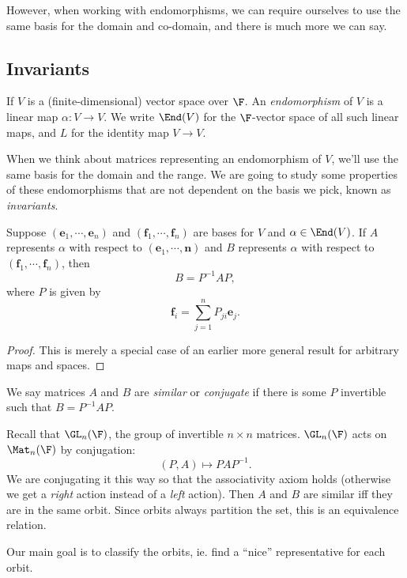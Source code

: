 \documentclass[a4paper]{article}
\begin{document}
However, when working with endomorphisms, we can require ourselves to use the same basis for the domain and co-domain, and there is much more we can say.

\subsection{Invariants}
\begin{defi}[]
  If $V$ is a (finite-dimensional) vector space over $\F$. An \emph{endomorphism} of $V$ is a linear map $\alpha: V \to V$. We write $\End(V)$ for the $\F$-vector space of all such linear maps, and $L$ for the identity map $V \to V$.
\end{defi}
When we think about matrices representing an endomorphism of $V$, we'll use the same basis for the domain and the range. We are going to study some properties of these endomorphisms that are not dependent on the basis we pick, known as \emph{invariants}.

\begin{lemma}
  Suppose $(\mathbf{e}_1, \cdots, \mathbf{e}_n)$ and $(\mathbf{f}_1, \cdots, \mathbf{f}_n)$ are bases for $V$ and $\alpha \in \End(V)$. If $A$ represents $\alpha$ with respect to $(\mathbf{e}_1, \cdots, \mathbf{n})$ and $B$ represents $\alpha$ with respect to $(\mathbf{f}_1,\cdots, \mathbf{f}_n)$, then
  \[
    B = P^{-1}AP,
  \]
  where $P$ is given by
  \[
    \mathbf{f}_i = \sum_{j = 1}^n P_{ji}\mathbf{e}_j.
  \]
\end{lemma}

\begin{proof}
  This is merely a special case of an earlier more general result for arbitrary maps and spaces.
\end{proof}

\begin{defi}
  We say matrices $A$ and $B$ are \emph{similar} or \emph{conjugate} if there is some $P$ invertible such that $B = P^{-1}AP$.
\end{defi}

Recall that $\GL_n(\F)$, the group of invertible $n\times n$ matrices. $\GL_n(\F)$ acts on $\Mat_n(\F)$ by conjugation:
\[
  (P, A) \mapsto PAP^{-1}.
\]
We are conjugating it this way so that the associativity axiom holds (otherwise we get a \emph{right} action instead of a \emph{left} action). Then $A$ and $B$ are similar iff they are in the same orbit. Since orbits always partition the set, this is an equivalence relation.

Our main goal is to classify the orbits, ie. find a ``nice'' representative for each orbit.
\end{document}

